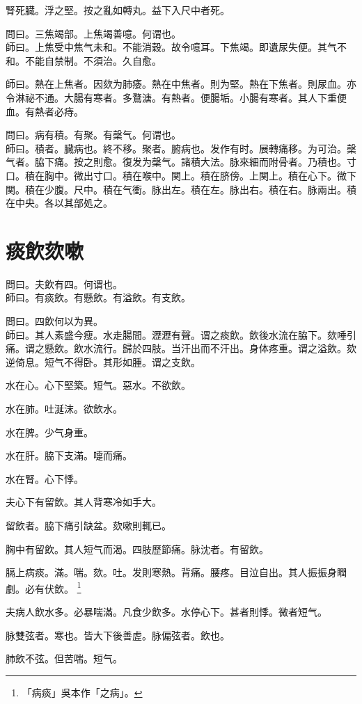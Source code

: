 \documentclass[12pt,twoside,UTF8,b5paper]{ctexbook}
\begin{document}
腎死臓。浮之堅。按之亂如轉丸。益下入尺中者死。

問曰。三焦竭部。上焦竭善噫。何谓也。\\
師曰。上焦受中焦气未和。不能消穀。故令噫耳。下焦竭。即遺尿失便。其气不和。不能自禁制。不須治。久自愈。

師曰。熱在上焦者。因欬为肺痿。熱在中焦者。則为堅。熱在下焦者。則尿血。亦令淋祕不通。大腸有寒者。多鶩溏。有熱者。便腸垢。小腸有寒者。其人下重便血。有熱者必痔。

問曰。病有積。有聚。有䅽气。何谓也。\\
師曰。積者。臓病也。終不移。聚者。腑病也。发作有时。展轉痛移。为可治。䅽气者。脇下痛。按之則愈。復发为䅽气。諸積大法。脉來細而附骨者。乃積也。寸口。積在胸中。微出寸口。積在喉中。関上。積在脐傍。上関上。積在心下。微下関。積在少腹。尺中。積在气衝。脉出左。積在左。脉出右。積在右。脉兩出。積在中央。各以其部処之。

\chapter{痰飲欬嗽}

問曰。夫飲有四。何谓也。\\
師曰。有痰飲。有懸飲。有溢飲。有支飲。

問曰。四飲何以为異。\\
師曰。其人素盛今瘦。水走腸間。瀝瀝有聲。谓之痰飲。飲後水流在脇下。欬唾引痛。谓之懸飲。飲水流行。歸於四肢。当汗出而不汗出。身体疼重。谓之溢飲。欬逆倚息。短气不得卧。其形如腫。谓之支飲。

水在心。心下堅築。短气。惡水。不欲飲。

水在肺。吐涎沫。欲飲水。

水在脾。少气身重。

水在肝。脇下支滿。嚏而痛。

水在腎。心下悸。

夫心下有留飲。其人背寒冷如手大。

留飲者。脇下痛引缺盆。欬嗽則輒已。

胸中有留飲。其人短气而渴。四肢歷節痛。脉沈者。有留飲。

膈上病痰。滿。喘。欬。吐。发則寒熱。背痛。腰疼。目泣自出。其人振振身瞤劇。必有伏飲。
	\footnote{「病痰」吳本作「之病」。}

夫病人飲水多。必暴喘滿。凡食少飲多。水停心下。甚者則悸。微者短气。

脉雙弦者。寒也。皆大下後善虗。脉偏弦者。飲也。

肺飲不弦。但苦喘。短气。
\end{document}

